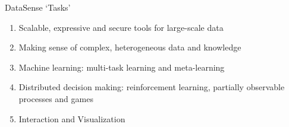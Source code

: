 \begin{frame}{DataSense `Tasks'}

\begin{enumerate}
\item Scalable, expressive and secure tools for large-scale data
\item Making sense of complex, heterogeneous data and knowledge
\item Machine learning: multi-task learning and meta-learning 
\item Distributed decision making: reinforcement learning, partially observable
processes and games
\item Interaction and Visualization
\end{enumerate}
\end{frame}

